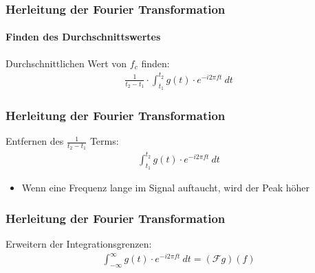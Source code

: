 \begin{frame}
    \frametitle{Herleitung der Fourier Transformation}
    \framesubtitle{Finden des Durchschnittswertes}
    Durchschnittlichen Wert von $f_c$ finden:
    \begin{align*}
        \frac{1}{t_2-t_1}\cdot \int_{t_1}^{t_2}{g(t)\cdot e^{-i2\pi f t}\ dt}
    \end{align*}
    \frametitle{Herleitung der Fourier Transformation}
    Entfernen des $\frac{1}{t_2-t_1}$ Terms:
    \begin{align*}
    \int_{t_1}^{t_2}{g(t)\cdot e^{-i2\pi f t}\ dt}
    \end{align*}
    \begin{itemize}
        \item Wenn eine Frequenz lange im Signal auftaucht, wird der Peak höher
    \end{itemize}
\end{frame}

\begin{frame}
    \frametitle{Herleitung der Fourier Transformation}
    Erweitern der Integrationsgrenzen:
    \begin{align*}
        \int_{-\infty}^{\infty}{g(t)\cdot e^{-i2\pi f t}\ dt}=(\mathcal{F}g)(f)
    \end{align*}
\end{frame}
